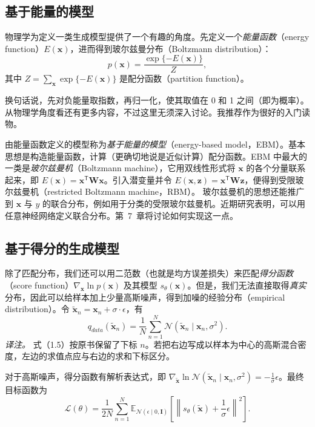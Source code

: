\subsection{基于能量的模型}
物理学为定义一类生成模型提供了一个有趣的角度。先定义一个\emph{能量函数}（energy function）$E(\mathbf{x})$，进而得到玻尔兹曼分布（Boltzmann distribution）：
\begin{equation}
p(\mathbf{x})=\frac{\exp\{-E(\mathbf{x})\}}{Z},
\tag{1.4}\label{eq:01-04}
\end{equation}
其中 $Z=\sum_{\mathbf{x}}\exp\{-E(\mathbf{x})\}$ 是配分函数（partition function）。

换句话说，先对负能量取指数，再归一化，使其取值在 0 和 1 之间（即为概率）。从物理学角度看还有更多内容，不过这里无须深入讨论。我推荐作为很好的入门读物。

由能量函数定义的模型称为\emph{基于能量的模型}（energy-based model，EBM）。基本思想是构造能量函数，计算（更确切地说是近似计算）配分函数。EBM 中最大的一类是\emph{玻尔兹曼机}（Boltzmann machine），它用双线性形式将 $\mathbf{x}$ 的各个分量联系起来，即 $E(\mathbf{x})=\mathbf{x}^{\mathsf{T}}\mathbf{W}\mathbf{x}$。引入潜变量并令 $E(\mathbf{x},\mathbf{z})=\mathbf{x}^{\mathsf{T}}\mathbf{W}\mathbf{z}$，便得到受限玻尔兹曼机（restricted Boltzmann machine，RBM）。
玻尔兹曼机的思想还能推广到 $\mathbf{x}$ 与 $y$ 的联合分布，例如用于分类的受限玻尔兹曼机。近期研究表明，可以用任意神经网络定义联合分布。第~7~章将讨论如何实现这一点。

\subsection{基于得分的生成模型}
除了匹配分布，我们还可以用二范数（也就是均方误差损失）来匹配\emph{得分函数}（score function）$\nabla_{\mathbf{x}}\ln p(\mathbf{x})$ 及其模型 $s_\theta(\mathbf{x})$。但是，我们无法直接取得\emph{真实}分布，因此可以给样本加上少量高斯噪声，得到加噪的经验分布（empirical distribution）。令 $\tilde{\mathbf{x}}_n=\mathbf{x}_n+\sigma\cdot\epsilon$，有
\begin{equation}
q_{\mathit{data}}(\tilde{\mathbf{x}}_n)
=\frac{1}{N}\sum_{n=1}^{N}\mathcal{N}(\tilde{\mathbf{x}}_n\mid\mathbf{x}_n,\sigma^2).
\tag{1.5}\label{eq:01-05}
\end{equation}
\emph{译注。} 式（1.5）按原书保留了下标 $n$。若把右边写成以样本为中心的高斯混合密度，左边的求值点应与右边的求和下标区分。

对于高斯噪声，得分函数有解析表达式，即 $\nabla_{\tilde{\mathbf{x}}}\ln\mathcal{N}(\tilde{\mathbf{x}}_n\mid\mathbf{x}_n,\sigma^2)=-\frac{1}{\sigma}\epsilon$。最终目标函数为
\begin{equation}
\mathcal{L}(\theta)=\frac{1}{2N}\sum_{n=1}^{N}
\mathbb{E}_{\mathcal{N}(\epsilon\mid 0,\mathbf{I})}
\left[\left\|s_\theta(\tilde{\mathbf{x}})+\frac{1}{\sigma}\epsilon\right\|^2\right].
\tag{1.6}\label{eq:01-06}
\end{equation}

